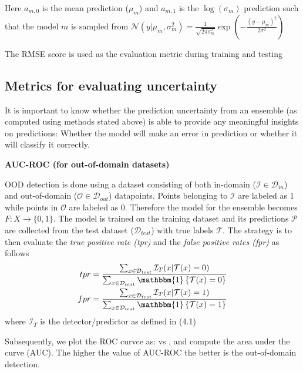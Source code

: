 \documentclass{article}
\begin{document}
Here $a_{m,0}$ is the mean prediction ($\mu_m$) and $a_{m,1}$ is the $\log(\sigma_m)$ prediction such that the model $m$ is sampled from $\mathcal{N}(y|\mu_m,\sigma_m^2) = \frac{1}{\sqrt{2\pi\sigma_m^2}}\exp\left( -\frac{(y-\mu_m)^2}{2\sigma^2} \right)$

The RMSE score is used as the evaluation metric during training and testing

\subsection{Metrics for evaluating uncertainty}

It is important to know whether the prediction uncertainty from an ensemble (as computed using methods stated above) is able to provide any meaningful insights on predictions: Whether the model will make an error in prediction or whether it will classify it correctly.

\textbf{AUC-ROC (for out-of-domain datasets)}

OOD detection is done using a dataset consisting of both in-domain ($\mathcal{I} \in \mathcal{D}_{in}$) and out-of-domain ($\mathcal{O} \in \mathcal{D}_{out}$) datapoints. Points belonging to $\mathcal{I}$ are labeled as 1 while points in $\mathcal{O}$ are labeled as 0. Therefore the model for the ensemble becomes $F : X \to \{0,1\}$. The model is trained on the training dataset and its predictions $\mathcal{P}$ are collected from the test dataset ($\mathcal{D}_{test}$) with true labels $\mathcal{T}$. The strategy is to then evaluate the \textit{true positive rate (tpr)} and the \textit{false positive rates (fpr)} as follows
\begin{align}
	\begin{split}
		tpr = \frac{\sum_{x \in \mathcal{D}_{test}} \mathcal{I}_T(x| \mathcal{T}(x) = 0)}{\sum_{x \in \mathcal{D}_{test}} \mathbbm{1}\left\{ \mathcal{T}(x) = 0\right\}} \\
		fpr  = \frac{\sum_{x \in \mathcal{D}_{test}} \mathcal{I}_T(x|\mathcal{T}(x) = 1)}{\sum_{x \in \mathcal{D}_{test}} \mathbbm{1}\left\{ \mathcal{T}(x) = 1\right\}} \\
	\end{split}
\end{align}
where $\mathcal{I}_T$ is the detector/predictor as defined in (4.1)

Subsequently, we plot the ROC curvce as:  vs , and compute the area under the curve (AUC). The higher the value of AUC-ROC the better is the out-of-domain detection.
\end{document}

